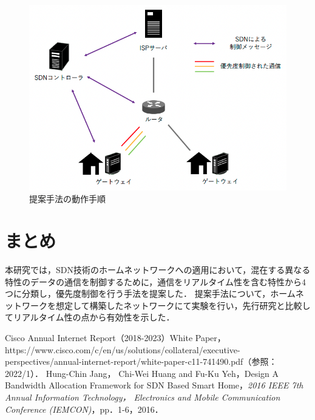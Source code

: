 \documentclass[a4paper,10pt,twocolumn,uplatex]{jsarticle}
\begin{document}
\begin{figure}[t]
	\begin{centering}
    \includegraphics[width=\linewidth]{img/proposal.png}
    \caption{提案手法の動作手順}
    \label{tab:sequence}
    \end{centering}
\end{figure}

\section{まとめ}
本研究では，SDN技術のホームネットワークへの適用において，混在する異なる特性のデータの通信を制御するために，通信をリアルタイム性を含む特性から4つに分類し，優先度制御を行う手法を提案した．
提案手法について，ホームネットワークを想定して構築したネットワークにて実験を行い，先行研究と比較してリアルタイム性の点から有効性を示した．

\footnotesize{
  \begin{thebibliography}{99}
     Cisco Annual Internet Report（2018-2023）White Paper，https://www.cisco.com/c/en/us/solutions/collateral/executive-perspectives/annual-internet-report/white-paper-c11-741490.pdf（参照：2022/1）．
     Hung-Chin Jang， Chi-Wei Huang and Fu-Ku Yeh，Design A Bandwidth Allocation Framework for SDN Based Smart Home，\textit{2016 IEEE 7th Annual Information Technology， Electronics and Mobile Communication Conference (IEMCON)}，pp．1-6，2016．
  \end{thebibliography}
}

% 
% 

\end{document}
